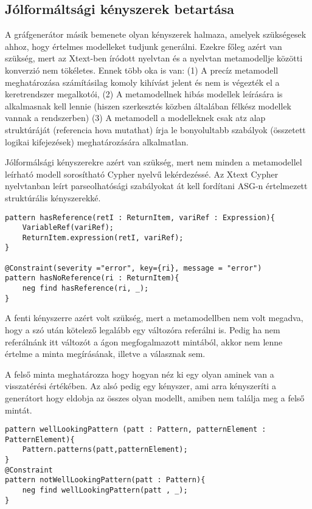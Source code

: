 \subsection{Jólformáltsági kényszerek betartása}
A gráfgenerátor másik bemenete olyan kényszerek halmaza, amelyek szükségesek ahhoz, hogy értelmes modelleket tudjunk generálni. Ezekre főleg azért van szükség, mert az Xtext-ben \cite{xText} íródott nyelvtan és a nyelvtan metamodellje közötti konverzió nem tökéletes. Ennek több oka is van: (1) A precíz metamodell meghatározása számításilag komoly kihívást jelent és nem is végezték el a keretrendszer megalkotói, (2) A metamodellnek hibás modellek leírására is alkalmasnak kell lennie (hiszen szerkesztés közben általában félkész modellek vannak a rendszerben) (3) A metamodell a modelleknek csak atz alap struktúráját (referencia hova mutathat) írja le bonyolultabb szabályok (összetett logikai kifejezések) meghatározására alkalmatlan.

Jólformálsági kényszerekre azért van szükség, mert nem minden a metamodellel leírható modell sorosítható Cypher nyelvű lekérdezéssé. Az Xtext Cypher nyelvtanban leírt parseolhatósági szabályokat át kell fordítani ASG-n értelmezett struktúrális kényszerekké. 




\begin{lstlisting}[style=viatrasmall]
pattern hasReference(retI : ReturnItem, variRef : Expression){
	VariableRef(variRef);
	ReturnItem.expression(retI, variRef);
}

@Constraint(severity ="error", key={ri}, message = "error")
pattern hasNoReference(ri : ReturnItem){
	neg find hasReference(ri, _);
}
\end{lstlisting}

A fenti kényszerre azért volt szükség, mert a metamodellben nem volt megadva, hogy a  szó után kötelező legalább egy változóra referálni is. Pedig ha nem referálnánk itt változót a  ágon megfogalmazott mintából, akkor nem lenne értelme a minta megírásának, illetve a válasznak sem.

A felső minta meghatározza hogy hogyan néz ki egy olyan  aminek van  a visszatérési értékében. Az alsó pedig egy kényszer, ami arra kényszeríti a generátort hogy eldobja az összes olyan modellt, amiben nem találja meg a felső mintát.

\begin{lstlisting}[style=viatrasmall]
pattern wellLookingPattern (patt : Pattern, patternElement : PatternElement){
	Pattern.patterns(patt,patternElement);
}
@Constraint 
pattern notWellLookingPattern(patt : Pattern){
	neg find wellLookingPattern(patt , _);
}
\end{lstlisting}

